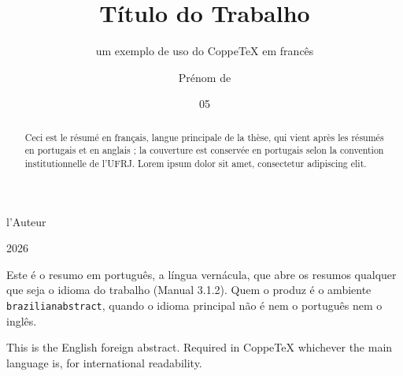 \documentclass[french,dsc]{ufrj}
\begin{document}
  \title{Título do Trabalho}
  \subtitle{um exemplo de uso do CoppeTeX em francês}
  \author{Prénom de}{l'Auteur}
  \date{05}{2026}
  \maketitle
  \frontmatter
  \begin{brazilianabstract}
    Este é o resumo em português, a língua vernácula, que abre os resumos
    qualquer que seja o idioma do trabalho (Manual 3.1.2). Quem o produz é o
    ambiente \texttt{brazilianabstract}, quando o idioma principal não é nem
    o português nem o inglês.
  \end{brazilianabstract}
  \begin{foreignabstract}
    This is the English foreign abstract. Required in CoppeTeX whichever
    the main language is, for international readability.
  \end{foreignabstract}
  \begin{abstract}
    Ceci est le résumé en français, langue principale de la thèse, qui vient
    après les résumés en portugais et en anglais ; la couverture est
    conservée en portugais selon la convention institutionnelle de l'UFRJ.
    Lorem ipsum dolor sit amet, consectetur adipiscing elit.
  \end{abstract}
  \tableofcontents
  \mainmatter
\end{document}
